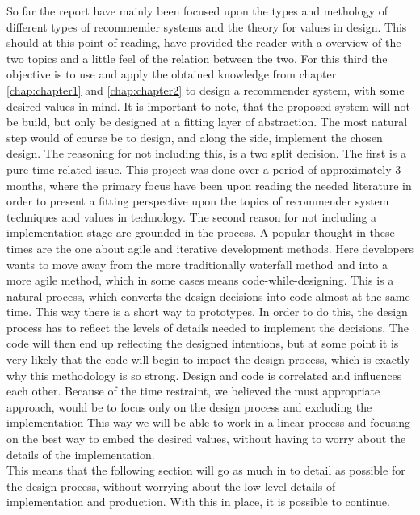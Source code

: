 So far the report have mainly been focused upon the types and methology of different types of recommender systems and the theory for values in design. This should at this point of reading, have provided the reader with a overview of the two topics and a little feel of the relation between the two. For this third the objective is to use and apply the obtained knowledge from chapter \ref{chap:chapter1} and \ref{chap:chapter2} to design a recommender system, with some desired values in mind. It is important to note, that the proposed system will not be build, but only be designed at a fitting layer of abstraction. The most natural step would of course be to design, and along the side, implement the chosen design. The reasoning for not including this, is a two split decision. The first is a pure time related issue. This project was done over a period of approximately 3 months, where the primary focus have been upon reading the needed literature in order to present a fitting perspective upon the topics of recommender system techniques and values in technology. The second reason for not including a implementation stage are grounded in the process. A popular thought in these times are the one about agile and iterative development methods. Here developers wants to move away from the more traditionally waterfall method and into a more agile method, which in some cases means code-while-designing. This is a natural process, which converts the design decisions into code almost at the same time. This way there is a short way to prototypes. In order to do this, the design process has to reflect the levels of details needed to implement the decisions. The code will then end up reflecting the designed intentions, but at some point it is very likely that the code will begin to impact the design process, which is exactly why this methodology is so strong. Design and code is correlated and influences each other. Because of the time restraint, we believed the must appropriate approach, would be to focus only on the design process and excluding the implementation This way we will be able to work in a linear process and focusing on the best way to embed the desired values, without having to worry about the details of the implementation.\\
This means that the following section will go as much in to detail as possible for the design process, without worrying about the low level details of implementation and production. With this in place, it is possible to continue. 


